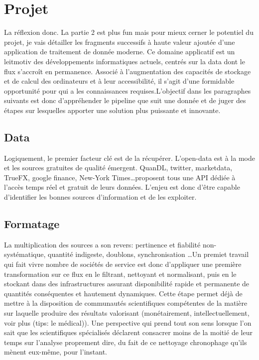 \section{Projet}


La réflexion donc. La partie 2 est plus fun mais pour mieux cerner le
potentiel du projet, je vais détailler les fragments successifs à haute
valeur ajoutée d'une application de traitement de donnée moderne.  Ce
domaine applicatif est un leitmotiv des développements informatiques
actuels, centrés sur la data dont le flux s'accroît en permanence. Associé
à l'augmentation des capacités de stockage et de calcul des ordinateurs et
à leur accessibilité, il s'agit d'une formidable opportunité pour qui a les
connaissances requises.\newline \newline L'objectif dans les paragraphes
suivants est donc d'appréhender le pipeline que suit une donnée et de juger
des étapes sur lesquelles apporter une solution plus puissante et
innovante.\newline

\subsection{Data}
        Logiquement, le premier facteur clé est de la récupérer.
L'open-data est à la mode et les sources gratuites de qualité émergent.
QuanDL, twitter, marketdata, TrueFX, google finance, New-York Times\ldots proposent tous
une API dédiée à l'accès temps réel et gratuit de leurs données.
L'enjeu est donc d'être capable d'identifier les bonnes sources
d'information et de les exploiter.


\subsection{Formatage}
        La multiplication des sources a son revers: pertinence et fiabilité
non-systématique, quantité indigeste, doublons, synchronisation \ldots Un
premiet travail qui fait vivre nombre de sociétés de service est donc
d'appliquer une première transformation sur ce flux en le filtrant, nettoyant
et normalisant, puis en le stockant dans des infrastructures assurant
disponibilité rapide et permanente de quantités conséquentes et hautement
dynamiques. \newline
Cette étape permet déjà de mettre à la disposition de communautés
scientifiques compétentes de la matière sur laquelle produire des résultats
valorisant (monétairement, intellectuellement, voir plus (tips: le
médical)). Une perspective qui prend tout son sens
lorsque l'on sait que les scientifiques spécialisés déclarent consacrer
moins de la moitié de leur temps sur l'analyse proprement dire, du fait de
ce nettoyage chronophage qu'ils mènent eux-même, pour l'instant.


